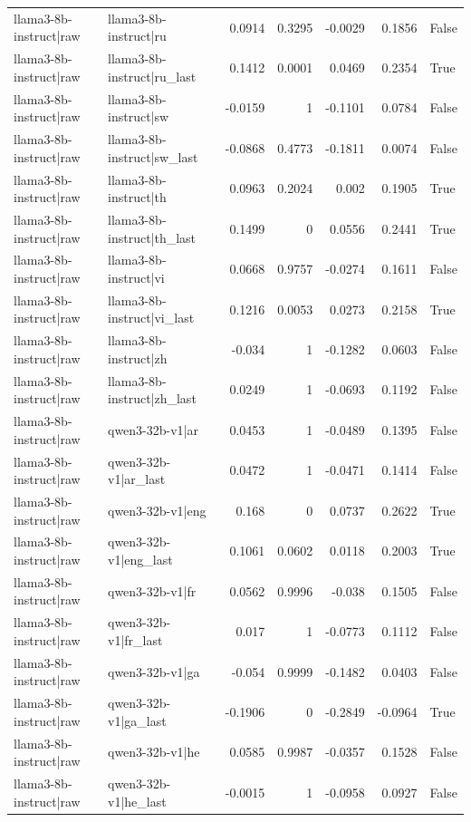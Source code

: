 \begin{table}
\begin{tabular}{l l r r r r l}
llama3-8b-instruct|raw & llama3-8b-instruct|ru & 0.0914 & 0.3295 & -0.0029 & 0.1856 & False \\
llama3-8b-instruct|raw & llama3-8b-instruct|ru_last & 0.1412 & 0.0001 & 0.0469 & 0.2354 & True \\
llama3-8b-instruct|raw & llama3-8b-instruct|sw & -0.0159 & 1 & -0.1101 & 0.0784 & False \\
llama3-8b-instruct|raw & llama3-8b-instruct|sw_last & -0.0868 & 0.4773 & -0.1811 & 0.0074 & False \\
llama3-8b-instruct|raw & llama3-8b-instruct|th & 0.0963 & 0.2024 & 0.002 & 0.1905 & True \\
llama3-8b-instruct|raw & llama3-8b-instruct|th_last & 0.1499 & 0 & 0.0556 & 0.2441 & True \\
llama3-8b-instruct|raw & llama3-8b-instruct|vi & 0.0668 & 0.9757 & -0.0274 & 0.1611 & False \\
llama3-8b-instruct|raw & llama3-8b-instruct|vi_last & 0.1216 & 0.0053 & 0.0273 & 0.2158 & True \\
llama3-8b-instruct|raw & llama3-8b-instruct|zh & -0.034 & 1 & -0.1282 & 0.0603 & False \\
llama3-8b-instruct|raw & llama3-8b-instruct|zh_last & 0.0249 & 1 & -0.0693 & 0.1192 & False \\
llama3-8b-instruct|raw & qwen3-32b-v1|ar & 0.0453 & 1 & -0.0489 & 0.1395 & False \\
llama3-8b-instruct|raw & qwen3-32b-v1|ar_last & 0.0472 & 1 & -0.0471 & 0.1414 & False \\
llama3-8b-instruct|raw & qwen3-32b-v1|eng & 0.168 & 0 & 0.0737 & 0.2622 & True \\
llama3-8b-instruct|raw & qwen3-32b-v1|eng_last & 0.1061 & 0.0602 & 0.0118 & 0.2003 & True \\
llama3-8b-instruct|raw & qwen3-32b-v1|fr & 0.0562 & 0.9996 & -0.038 & 0.1505 & False \\
llama3-8b-instruct|raw & qwen3-32b-v1|fr_last & 0.017 & 1 & -0.0773 & 0.1112 & False \\
llama3-8b-instruct|raw & qwen3-32b-v1|ga & -0.054 & 0.9999 & -0.1482 & 0.0403 & False \\
llama3-8b-instruct|raw & qwen3-32b-v1|ga_last & -0.1906 & 0 & -0.2849 & -0.0964 & True \\
llama3-8b-instruct|raw & qwen3-32b-v1|he & 0.0585 & 0.9987 & -0.0357 & 0.1528 & False \\
llama3-8b-instruct|raw & qwen3-32b-v1|he_last & -0.0015 & 1 & -0.0958 & 0.0927 & False \\

\end{tabular}
\end{table}
